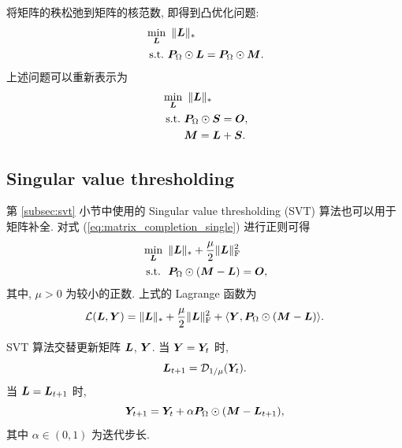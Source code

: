 \documentclass[12pt]{article}
\begin{document}
将矩阵的秩松弛到矩阵的核范数, 即得到凸优化问题:
\begin{equation}
  \label{eq:matrix_completion_single}
  \begin{aligned}
    &\min_{\bm{L}}~\|\bm{L}\|_{*} \\
    &~\text{s.t.}~\bm{P}_\Omega\odot\bm{L}=\bm{P}_\Omega\odot\bm{M}.\\
  \end{aligned}
\end{equation}
上述问题可以重新表示为
\begin{equation}
  \label{eq:matrix_completion}
  \begin{aligned}
    &\min_{\bm{L}}~\|\bm{L}\|_{*} \\
    &~\text{s.t.}~\bm{P}_\Omega\odot\bm{S}=\bm{O},\\
    &\qquad \bm{M}=\bm{L}+\bm{S}.
  \end{aligned}
\end{equation}



\subsection{Singular value thresholding}

第 \ref{subsec:svt} 小节中使用的 Singular value thresholding (SVT) \cite{cai2010singular} 算法也可以用于矩阵补全. 
对式 (\ref{eq:matrix_completion_single}) 进行正则可得
\begin{equation}
  \begin{aligned}
    &\min_{\bm{L}}~\|\bm{L}\|_{*}+\frac{\mu}{2}\|\bm{L}\|_{\text{F}}^2 \\
    &~\text{s.t.}~~\bm{P}_\Omega\odot(\bm{M}-\bm{L})=\bm{O},
  \end{aligned}
\end{equation}
其中, $\mu>0$ 为较小的正数. 上式的 Lagrange 函数为
\begin{equation}
  \mathcal{L}(\bm{L},\bm{Y})=\|\bm{L}\|_{*}+\frac{\mu}{2}\|\bm{L}\|_{\text{F}}^2+\langle\bm{Y},\bm{P}_\Omega\odot(\bm{M}-\bm{L})\rangle.
\end{equation}

SVT 算法交替更新矩阵 $\bm{L}$, $\bm{Y}$. 当 $\bm{Y}=\bm{Y}_t$ 时,
\begin{equation}
  \bm{L}_{t+1}
  =\mathcal{D}_{1/\mu}(\bm{Y}_t).
\end{equation}
当 $\bm{L}=\bm{L}_{t+1}$ 时,
\begin{equation}
  \bm{Y}_{t+1}
  =\bm{Y}_t+\alpha\bm{P}_\Omega\odot(\bm{M}-\bm{L}_{t+1}),
\end{equation}
其中 $\alpha\in(0,1)$ 为迭代步长.
\end{document}

